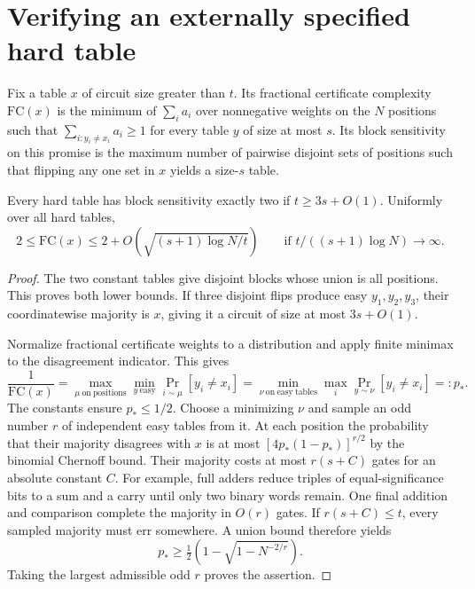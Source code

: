 \section{Verifying an externally specified hard table}

Fix a table \(x\) of circuit size greater than \(t\). Its fractional certificate complexity \(\mathrm{FC}(x)\) is the minimum of \(\sum_i a_i\) over nonnegative weights on the \(N\) positions such that \(\sum_{i:y_i\ne x_i}a_i\ge1\) for every table \(y\) of size at most \(s\). Its block sensitivity on this promise is the maximum number of pairwise disjoint sets of positions such that flipping any one set in \(x\) yields a size-\(s\) table.

\begin{theorem}
Every hard table has block sensitivity exactly two if \(t\ge3s+O(1)\). Uniformly over all hard tables,
\[
   2\le \mathrm{FC}(x)\le 2+O\!\left(\sqrt{(s+1)\log N/t}\right)
   \qquad\text{if }t/((s+1)\log N)\to\infty .
\]
\end{theorem}
\begin{proof}
The two constant tables give disjoint blocks whose union is all positions. This proves both lower bounds. If three disjoint flips produce easy \(y_1,y_2,y_3\), their coordinatewise majority is \(x\), giving it a circuit of size at most \(3s+O(1)\).

Normalize fractional certificate weights to a distribution and apply finite minimax to the disagreement indicator. This gives
\[
 \frac1{\mathrm{FC}(x)}
 =\max_{\mu\ \mathrm{on\ positions}}\min_{y\ \mathrm{easy}}
         \Pr_{i\sim\mu}[y_i\ne x_i]
 =\min_{\nu\ \mathrm{on\ easy\ tables}}\max_i
         \Pr_{y\sim\nu}[y_i\ne x_i]=:p_* .
\]
The constants ensure \(p_*\le1/2\). Choose a minimizing \(\nu\) and sample an odd number \(r\) of independent easy tables from it. At each position the probability that their majority disagrees with \(x\) is at most
\([4p_*(1-p_*)]^{r/2}\) by the binomial Chernoff bound. Their majority costs at most \(r(s+C)\) gates for an absolute constant \(C\). For example, full adders reduce triples of equal-significance bits to a sum and a carry until only two binary words remain. One final addition and comparison complete the majority in \(O(r)\) gates. If \(r(s+C)\le t\), every sampled majority must err somewhere. A union bound therefore yields
\[
 p_*\ge\tfrac12\left(1-\sqrt{1-N^{-2/r}}\right).
\]
Taking the largest admissible odd \(r\) proves the assertion.
\end{proof}

